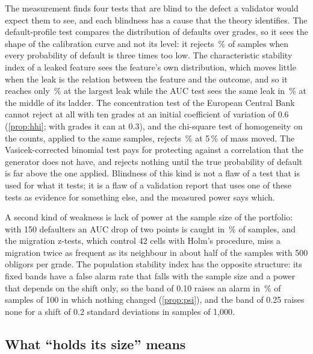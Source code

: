 The measurement finds four tests that are blind to the defect a validator would expect them to see, and each blindness has a cause that the theory identifies.
The default-profile test compares the distribution of defaults over grades, so it sees the shape of the calibration curve and not its level: it rejects \profKThree\,\% of samples when every probability of default is three times too low.
The characteristic stability index of a leaked feature sees the feature's own distribution, which moves little when the leak is the relation between the feature and the outcome, and so it reaches only \leakCsiTwo\,\% at the largest leak while the AUC test sees the same leak in \leakAucZeroFive\,\% at the middle of its ladder.
The concentration test of the European Central Bank cannot reject at all with ten grades at an initial coefficient of variation of 0.6 (\cref{prop:hhi}; with \hhiKMinThree{} grades it can at 0.3), and the chi-square test of homogeneity on the counts, applied to the same samples, rejects \chiCountZeroZeroFive\,\% at 5\,\% of mass moved.
The Vasicek-corrected binomial test pays for protecting against a correlation that the generator does not have, and rejects nothing until the true probability of default is far above the one applied.
Blindness of this kind is not a flaw of a test that is used for what it tests; it is a flaw of a validation report that uses one of these tests as evidence for something else, and the measured power says which.

A second kind of weakness is lack of power at the sample size of the portfolio: with 150 defaulters an AUC drop of two points is caught in \ecbDropZeroTwo\,\% of samples, and the migration z-tests, which control 42 cells with Holm's procedure, miss a migration twice as frequent as its neighbour in about half of the samples with 500 obligors per grade.
The population stability index has the opposite structure: its fixed bands have a false alarm rate that falls with the sample size and a power that depends on the shift only, so the band of 0.10 raises an alarm in \psiHundred\,\% of samples of 100 in which nothing changed (\cref{prop:psi}), and the band of 0.25 raises none for a shift of 0.2 standard deviations in samples of 1,000.

\subsection{What ``holds its size'' means}
\label{sec:di-holds}


